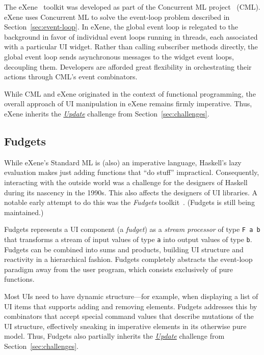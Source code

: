 \documentclass[sigplan,screen]{acmart}
\begin{document}
The eXene~\cite{eXene} toolkit was developed as part of the Concurrent
ML project~\cite{ConcurrentML} (CML).  eXene
uses Concurrent ML to solve the event-loop problem described in
Section~\ref{sec:event-loop}.  In eXene, the global event loop is
relegated to the background in favor of individual event loops running
in threads, each associated with a particular UI widget.  Rather than calling
subscriber methods directly, the global event loop sends asynchronous
messages to the widget event loops, decoupling them.  Developers
are afforded great flexibility in orchestrating their
actions through CML's event combinators.

While CML and eXene originated in the context of functional
programming, the overall approach of UI manipulation in eXene remains
firmly imperative.  Thus, eXene inherits the \hyperlink{challenge:update}{\textit{Update}} challenge from Section~\ref{sec:challenges}.

\subsection{Fudgets}

While eXene's Standard ML is (also) an imperative language,
Haskell's lazy evaluation makes just adding functions that ``do
stuff'' impractical.  Consequently, interacting with the outside world
was a challenge for the designers of Haskell during its
nascency in the 1990s.  This also affects the designers of UI
libraries.  A notable early attempt to do this was the
\textit{Fudgets} toolkit~\cite{Fudgets}.  (Fudgets is still being maintained.)

Fudgets represents a UI component (a \textit{fudget}) as a
\textit{stream processor} of type \verb|F a b| that transforms a
stream of input values of type \texttt{a} into output values of type
\texttt{b}.  Fudgets can be combined into sums and products, building
UI structure and reactivity in a hierarchical fashion.  Fudgets
completely abstracts the event-loop paradigm away from the user
program, which consists exclusively of pure functions.

Most UIs
need to have dynamic structure---for example, when
displaying a list of UI items that supports adding and removing
elements.  Fudgets addresses this by combinators that accept special
command values that describe mutations of the UI structure,
effectively sneaking in imperative elements in its otherwise pure
model.  Thus, Fudgets also partially inherits the \hyperlink{challenge:update}{\textit{Update}} challenge from
Section~\ref{sec:challenges}.
\end{document}
